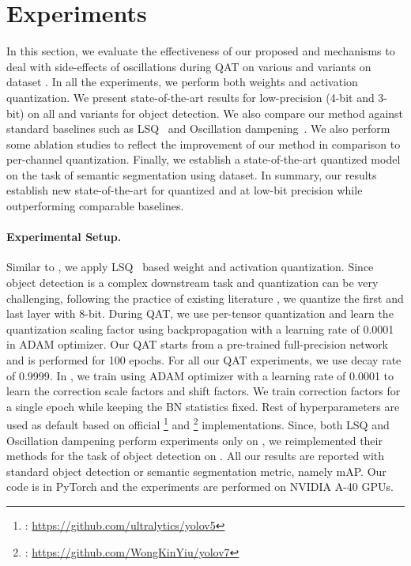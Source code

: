\section{Experiments}


In this section, we evaluate the effectiveness of our proposed \exma{} and \qc{} mechanisms to deal with side-effects of oscillations during \acrshort{QAT} on various \yoloa{} and \yolob{} variants on \coco{} dataset \cite{lin2014microsoft}. In all the experiments, we perform both weights and activation quantization. We present state-of-the-art results for low-precision (4-bit and 3-bit) on all \yoloa{} and \yolob{} variants for object detection. We also compare our method against standard baselines such as \acrshort{LSQ}~\cite{lsq} and Oscillation dampening~\cite{nagel2022overcoming}. We also perform some ablation studies to reflect the improvement of our method in comparison to per-channel quantization. Finally, we establish a state-of-the-art quantized \yoloa{} model on the task of semantic segmentation using \coco{} dataset. In summary, our results establish new state-of-the-art for quantized \yoloa{} and \yolob{} at low-bit precision while outperforming comparable baselines. 

\paragraph{Experimental Setup.} 
Similar to \cite{nagel2022overcoming}, we apply \acrshort{LSQ}~\cite{lsq} based weight and activation quantization. Since object detection is a complex downstream task and quantization can be very challenging, following the practice of existing literature \cite{lsq}, we quantize the first and last layer with 8-bit. During \acrshort{QAT}, we use per-tensor quantization \cite{krishnamoorthi} and learn the quantization scaling factor using backpropagation \cite{lsq} with a learning rate of 0.0001 in \acrshort{ADAM} optimizer. Our \acrshort{QAT} starts from a pre-trained full-precision network and is performed for 100 epochs. For all our \acrshort{QAT} experiments, we use \exma{} decay rate of 0.9999. In \qc{}, we train using \acrshort{ADAM} optimizer with a learning rate of 0.0001 to learn the correction scale factors and shift factors. We train correction factors for a single epoch while keeping the \acrfull{BN} statistics fixed. Rest of hyperparameters are used as default based on official \yoloa{}\footnote{\yoloa{}:  \href{https://github.com/ultralytics/yolov5}{https://github.com/ultralytics/yolov5}} and \yolob{}\footnote{\yolob{}: \href{https://github.com/WongKinYiu/yolov7}{https://github.com/WongKinYiu/yolov7}} implementations. Since, both \acrshort{LSQ} and Oscillation dampening perform experiments only on \imagenet{}, we reimplemented their methods for the task of object detection on \yolo{}. All our results are reported with standard object detection or semantic segmentation metric, namely mAP. Our code is in PyTorch and the experiments are performed on NVIDIA A-40 GPUs. 


